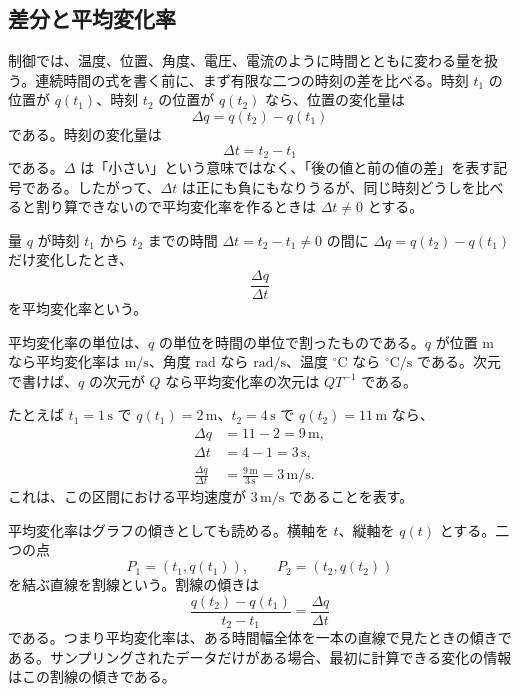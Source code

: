 \subsection{差分と平均変化率}

制御では、温度、位置、角度、電圧、電流のように時間とともに変わる量を扱う。連続時間の式を書く前に、まず有限な二つの時刻の差を比べる。時刻 $t_1$ の位置が $q(t_1)$、時刻 $t_2$ の位置が $q(t_2)$ なら、位置の変化量は
\begin{equation}
  \Delta q=q(t_2)-q(t_1)
\end{equation}
である。時刻の変化量は
\begin{equation}
  \Delta t=t_2-t_1
\end{equation}
である。$\Delta$ は「小さい」という意味ではなく、「後の値と前の値の差」を表す記号である。したがって、$\Delta t$ は正にも負にもなりうるが、同じ時刻どうしを比べると割り算できないので平均変化率を作るときは $\Delta t\ne0$ とする。

\begin{definition}[平均変化率]
量 $q$ が時刻 $t_1$ から $t_2$ までの時間 $\Delta t=t_2-t_1\ne0$ の間に $\Delta q=q(t_2)-q(t_1)$ だけ変化したとき、
\begin{equation}
  \frac{\Delta q}{\Delta t}
\end{equation}
を平均変化率という。
\end{definition}

平均変化率の単位は、$q$ の単位を時間の単位で割ったものである。$q$ が位置 m なら平均変化率は $\mathrm{m/s}$、角度 rad なら $\mathrm{rad/s}$、温度 $^\circ\mathrm{C}$ なら $^\circ\mathrm{C/s}$ である。次元で書けば、$q$ の次元が $Q$ なら平均変化率の次元は $QT^{-1}$ である。

たとえば $t_1=1\,\mathrm{s}$ で $q(t_1)=2\,\mathrm{m}$、$t_2=4\,\mathrm{s}$ で $q(t_2)=11\,\mathrm{m}$ なら、
\begin{align}
  \Delta q&=11-2=9\,\mathrm{m},\\
  \Delta t&=4-1=3\,\mathrm{s},\\
  \frac{\Delta q}{\Delta t}&=\frac{9\,\mathrm{m}}{3\,\mathrm{s}}=3\,\mathrm{m/s}.
\end{align}
これは、この区間における平均速度が $3\,\mathrm{m/s}$ であることを表す。

平均変化率はグラフの傾きとしても読める。横軸を $t$、縦軸を $q(t)$ とする。二つの点
\begin{equation}
  P_1=(t_1,q(t_1)),\qquad P_2=(t_2,q(t_2))
\end{equation}
を結ぶ直線を割線という。割線の傾きは
\begin{equation}
  \frac{q(t_2)-q(t_1)}{t_2-t_1}
  =\frac{\Delta q}{\Delta t}
\end{equation}
である。つまり平均変化率は、ある時間幅全体を一本の直線で見たときの傾きである。サンプリングされたデータだけがある場合、最初に計算できる変化の情報はこの割線の傾きである。

